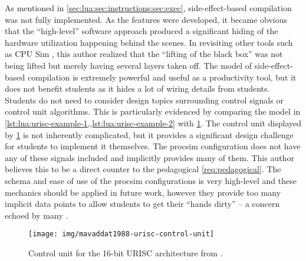 As mentioned in \cref{sec:lua:sec:instructions:sec:exec}, side-effect-based compilation was not fully implemented. As the features were developed, it became obvious that the ``high-level'' software approach produced a significant hiding of the hardware utilization happening behind the scenes. In revisiting other tools such as CPU Sim \cite{Skrien2001}, this author realized that the ``lifting of the black box'' was not being lifted but merely having several layers taken off. The model of side-effect-based compilation is extremely powerful and useful as a productivity tool, but it does not benefit students as it hides a lot of wiring details from students. Students do not need to consider design topics surrounding control signals or control unit algorithms. This is particularly evidenced by comparing the model in \cref{lst:lua:urisc-example-1,,lst:lua:urisc-example-2} with \cref{fig:mavaddat1988-urisc-control-unit}. The control unit displayed by \cref{fig:mavaddat1988-urisc-control-unit} is not inherently complicated, but it provides a significant design challenge for students to implement it themselves. The procsim configuration does not have any of these signals included and implicitly provides many of them. This author believes this to be a direct counter to the pedagogical \cref{req:pedagogical}. The schema and ease of use of the procsim configurations is very high-level and these mechanics should be applied in future work, however they provide too many implicit data points to allow students to get their ``hands dirty'' -- a concern echoed by many \cite{Skrien2001,Garcia2009,Ackovska2014,Black2013}.

\begin{figure}[hb!]
    \centering
    \texttt{[image: img/mavaddat1988-urisc-control-unit]}
    \caption{Control unit for the 16-bit URISC architecture from \cite[p.~331]{Mavaddat1988}.}
    \label{fig:mavaddat1988-urisc-control-unit}
\end{figure}
